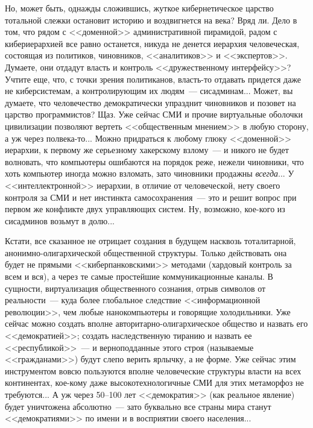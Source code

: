 \documentclass{scrbook}
\newcommand{\flqq}{<<}
\newcommand{\frqq}{>>}
\newcommand{\mdash}{~--- }
\newcommand{\ndash}{--}
\begin{document}
Но, может быть, однажды сложившись, жуткое кибернетическое царство тотальной слежки остановит историю и воздвигнется на века? Вряд ли. Дело в том, что рядом с {\flqq}доменной{\frqq} административной пирамидой, радом с кибериерархией все равно останется, никуда не денется иерархия человеческая, состоящая из политиков, чиновников, {\flqq}аналитиков{\frqq} и {\flqq}экспертов{\frqq}. Думаете, они отдадут власть и контроль {\flqq}дружественному интерфейсу{\frqq}? Учтите еще, что, с точки зрения политиканов, власть-то отдавать придется даже не киберсистемам, а контролирующим их людям{\mdash}сисадминам... Может, вы думаете, что человечество демократически упразднит чиновников и позовет на царство программистов? Щаз. Уже сейчас СМИ и прочие виртуальные оболочки цивилизации позволяют вертеть {\flqq}общественным мнением{\frqq} в любую сторону, а уж через полвека-то... Можно придраться к любому глюку {\flqq}доменной{\frqq} иерархии, к первому же серьезному хакерскому взлому{\mdash}и никого не будет волновать, что компьютеры ошибаются на порядок реже, нежели чиновники, что хоть компьютер иногда можно взломать, зато чиновники продажны \emph{всегда}... У {\flqq}интеллектронной{\frqq} иерархии, в отличие от человеческой, нету своего контроля за СМИ и нет инстинкта самосохранения{\mdash}это и решит вопрос при первом же конфликте двух управляющих систем. Ну, возможно, кое-кого из сисадминов возьмут в долю...

Кстати, все сказанное не отрицает создания в будущем насквозь тоталитарной, анонимно-олигархической общественной структуры. Только действовать она будет не прямыми {\flqq}киберпанковскими{\frqq} методами (хардовый контроль за всем и вся), а через те самые простейшие коммуникационные каналы. В сущности, виртуализация общественного сознания, отрыв символов от реальности{\mdash}куда более глобальное следствие {\flqq}информационной революции{\frqq}, чем любые нанокомпьютеры и говорящие холодильники. Уже сейчас можно создать вполне авторитарно-олигархическое общество и назвать его {\flqq}демократией{\frqq}; создать наследственную тиранию и назвать ее {\flqq}республикой{\frqq}{\mdash}и верноподданные этого строя (называемые {\flqq}гражданами{\frqq}) будут слепо верить ярлычку, а не форме. Уже сейчас этим инструментом вовсю пользуются вполне человеческие структуры власти на всех континентах, кое-кому даже высокотехнологичные СМИ для этих метаморфоз не требуются... А уж через 50{\ndash}100 лет {\flqq}демократия{\frqq} (как реальное явление) будет уничтожена абсолютно{\mdash}зато буквально все страны мира станут {\flqq}демократиями{\frqq} по имени и в восприятии своего населения...
\end{document}
